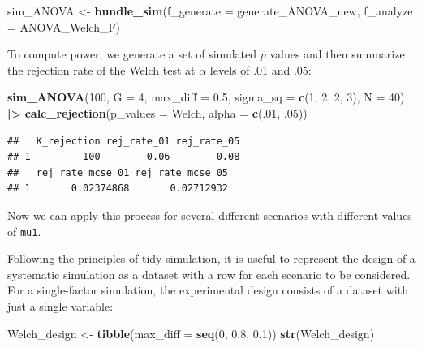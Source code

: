 \documentclass[
]{book}
\newenvironment{Shaded}{\begin{snugshade}}{\end{snugshade}}
\newcommand{\AttributeTok}[1]{\textcolor[rgb]{0.13,0.29,0.53}{#1}}
\newcommand{\DecValTok}[1]{\textcolor[rgb]{0.00,0.00,0.81}{#1}}
\newcommand{\FloatTok}[1]{\textcolor[rgb]{0.00,0.00,0.81}{#1}}
\newcommand{\FunctionTok}[1]{\textcolor[rgb]{0.13,0.29,0.53}{\textbf{#1}}}
\newcommand{\NormalTok}[1]{#1}
\newcommand{\OtherTok}[1]{\textcolor[rgb]{0.56,0.35,0.01}{#1}}
\newcommand{\SpecialCharTok}[1]{\textcolor[rgb]{0.81,0.36,0.00}{\textbf{#1}}}
\begin{document}
\begin{Shaded}
\begin{Highlighting}[]
\NormalTok{sim\_ANOVA }\OtherTok{\textless{}{-}} \FunctionTok{bundle\_sim}\NormalTok{(}\AttributeTok{f\_generate =}\NormalTok{ generate\_ANOVA\_new, }\AttributeTok{f\_analyze =}\NormalTok{ ANOVA\_Welch\_F)}
\end{Highlighting}
\end{Shaded}

To compute power, we generate a set of simulated \(p\) values and then summarize the rejection rate of the Welch test at \(\alpha\) levels of .01 and .05:

\begin{Shaded}
\begin{Highlighting}[]
\FunctionTok{sim\_ANOVA}\NormalTok{(}\DecValTok{100}\NormalTok{, }\AttributeTok{G =} \DecValTok{4}\NormalTok{, }\AttributeTok{max\_diff =} \FloatTok{0.5}\NormalTok{, }\AttributeTok{sigma\_sq =} \FunctionTok{c}\NormalTok{(}\DecValTok{1}\NormalTok{, }\DecValTok{2}\NormalTok{, }\DecValTok{2}\NormalTok{, }\DecValTok{3}\NormalTok{), }\AttributeTok{N =} \DecValTok{40}\NormalTok{) }\SpecialCharTok{|\textgreater{}}
  \FunctionTok{calc\_rejection}\NormalTok{(}\AttributeTok{p\_values =}\NormalTok{ Welch, }\AttributeTok{alpha =} \FunctionTok{c}\NormalTok{(.}\DecValTok{01}\NormalTok{, .}\DecValTok{05}\NormalTok{))}
\end{Highlighting}
\end{Shaded}

\begin{verbatim}
##   K_rejection rej_rate_01 rej_rate_05
## 1         100        0.06        0.08
##   rej_rate_mcse_01 rej_rate_mcse_05
## 1       0.02374868       0.02712932
\end{verbatim}

Now we can apply this process for several different scenarios with different values of \texttt{mu1}.

Following the principles of tidy simulation, it is useful to represent the design of a systematic simulation as a dataset with a row for each scenario to be considered.
For a single-factor simulation, the experimental design consists of a dataset with just a single variable:

\begin{Shaded}
\begin{Highlighting}[]
\NormalTok{Welch\_design }\OtherTok{\textless{}{-}} \FunctionTok{tibble}\NormalTok{(}\AttributeTok{max\_diff =} \FunctionTok{seq}\NormalTok{(}\DecValTok{0}\NormalTok{, }\FloatTok{0.8}\NormalTok{, }\FloatTok{0.1}\NormalTok{))}
\FunctionTok{str}\NormalTok{(Welch\_design)}
\end{Highlighting}
\end{Shaded}
\end{document}
